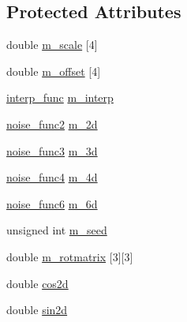 \subsection*{Protected Attributes}
\begin{DoxyCompactItemize}
\item 
double \hyperlink{classanl_1_1CImplicitBasisFunction_a6a72d1b2386593a8b3f0c8e384e95212}{m\_\-scale} \mbox{[}4\mbox{]}
\item 
double \hyperlink{classanl_1_1CImplicitBasisFunction_a74ea516a0c09756a1f42629647866ac1}{m\_\-offset} \mbox{[}4\mbox{]}
\item 
\hyperlink{namespaceanl_a2c8cd5d25499b47ef49c82dea75ba8dd}{interp\_\-func} \hyperlink{classanl_1_1CImplicitBasisFunction_a08395f1762637c16029bd8fa2794c44c}{m\_\-interp}
\item 
\hyperlink{namespaceanl_afde4e91ea2a8d75a93c4abe8c7eacd83}{noise\_\-func2} \hyperlink{classanl_1_1CImplicitBasisFunction_a912c32d0c8ea3bec56cd6053dca38645}{m\_\-2d}
\item 
\hyperlink{namespaceanl_a92b0e78f6459c949d2f7b08a91b843e5}{noise\_\-func3} \hyperlink{classanl_1_1CImplicitBasisFunction_a413203dc10d821e6884782ec4474cd28}{m\_\-3d}
\item 
\hyperlink{namespaceanl_a3482023bba3cc79a7a5e569d38aa7259}{noise\_\-func4} \hyperlink{classanl_1_1CImplicitBasisFunction_afacdd14c7ff8c9dcfd9847b87ae2e250}{m\_\-4d}
\item 
\hyperlink{namespaceanl_a7e1d1c8ad49ec7a95b33a1a75b6ffbcb}{noise\_\-func6} \hyperlink{classanl_1_1CImplicitBasisFunction_a29c04889dcf6cd874c289becaad1e921}{m\_\-6d}
\item 
unsigned int \hyperlink{classanl_1_1CImplicitBasisFunction_a744ec9f082626325b9dbe9b2fea72cea}{m\_\-seed}
\item 
double \hyperlink{classanl_1_1CImplicitBasisFunction_a5b7f88a072d9fd631e277eca1975cfd5}{m\_\-rotmatrix} \mbox{[}3\mbox{]}\mbox{[}3\mbox{]}
\item 
double \hyperlink{classanl_1_1CImplicitBasisFunction_af6199d27242cd9df2d619b38647cf437}{cos2d}
\item 
double \hyperlink{classanl_1_1CImplicitBasisFunction_af0dd30c4091a08c6e3117e55b416b97e}{sin2d}
\end{DoxyCompactItemize}


